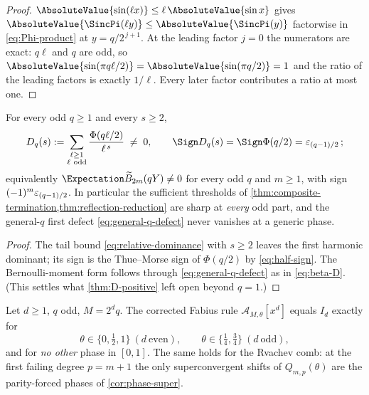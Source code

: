 \begin{proof}
$\AbsoluteValue{\sin(\ell x)}\le\ell\,\AbsoluteValue{\sin x}$ gives
$\AbsoluteValue{\SincPi(\ell y)}\le\AbsoluteValue{\SincPi(y)}$ factorwise in
\eqref{eq:Phi-product} at $y=q/2^{\,j+1}$.  At the leading factor
$j=0$ the numerators are exact: $q\ell$ and $q$ are odd, so
$\AbsoluteValue{\sin(\pi q\ell/2)}=\AbsoluteValue{\sin(\pi q/2)}=1$ and the ratio of the
leading factors is exactly $1/\ell$.  Every later factor contributes
a ratio at most one.
\end{proof}

\begin{theorem}
\label{thm:twisted-D-positive}
For every odd $q\ge1$ and every $s\ge2$,
\begin{equation}
 D_q(s):=\sum_{\substack{\ell\ge1\\ \ell\ \mathrm{odd}}}
 \frac{\Phi(q\ell/2)}{\ell^{\,s}}
 \;\ne\;0,
 \qquad
 \Sign D_q(s)=\Sign\Phi(q/2)=\eps_{(q-1)/2}\,;
 \label{eq:twisted-positive}
\end{equation}
equivalently $\Expectation\widetilde B_{2m}(qY)\ne0$ for every odd $q$ and
$m\ge1$, with sign $(-1)^{m}\varepsilon_{(q-1)/2}$.  In particular the
sufficient thresholds of
\cref{thm:composite-termination,thm:reflection-reduction} are sharp
at \emph{every} odd part, and the general-$q$ first defect
\eqref{eq:general-q-defect} never vanishes at a generic phase.
\end{theorem}

\begin{proof}
The tail bound \eqref{eq:relative-dominance} with $s\ge2$ leaves the
first harmonic dominant; its sign is the Thue--Morse sign of
$\Phi(q/2)$ by \eqref{eq:half-sign}.  The Bernoulli-moment form
follows through \eqref{eq:general-q-defect} as in \eqref{eq:beta-D}.
(This settles what \cref{thm:D-positive} left open beyond $q=1$.)
\end{proof}

\begin{theorem}
\label{thm:phase-zero-set}
Let $d\ge1$, $q$ odd, $M=2^{d}q$.  The corrected Fabius rule
$\mathcal A_{M,\theta}[x^{d}]$ equals $I_d$ exactly for
\begin{equation}
 \theta\in\{0,\tfrac12,1\}\ (d\ \text{even}),
 \qquad
 \theta\in\{\tfrac14,\tfrac34\}\ (d\ \text{odd}),
 \label{eq:zero-set}
\end{equation}
and for \emph{no other} phase in $[0,1]$.  The same holds for the
Rvachev comb: at the first failing degree $p=m+1$ the only
superconvergent shifts of $Q_{m,p}(\theta)$ are the parity-forced
phases of \cref{cor:phase-super}.
\end{theorem}

